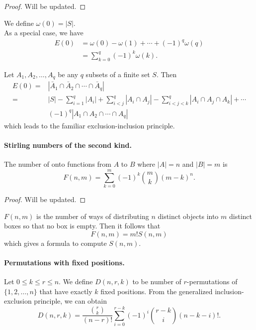 \documentclass[12pt,english,oneside]{scrbook}
\numberwithin{equation}{chapter}
\theoremstyle{definition}
\theoremstyle{plain}
\begin{document}
\begin{proof}
  Will be updated.
\end{proof}

We define $\omega(0) = |S|$. \\

As a special case, we have
\begin{align*}
  E(0) &= \omega(0) - \omega(1) + \cdots + (-1)^q \omega(q) \\
       &= \sum_{k=0}^q (-1)^k \omega(k).
\end{align*}

Let $A_1, A_2, \ldots, A_q$ be any $q$ subsets of a finite set $S$. Then
\begin{align*}
  E(0)=&|\bar A_1 \cap \bar A_2 \cap \cdots \cap \bar A_q | \\
  =&|S| - \sum_{i=1}^q |A_i| + \sum_{i<j}^q |A_i \cap A_j | - \sum_{i<j<k}^q |A_i \cap A_j \cap A_k | + \cdots \\
  &(-1)^q |A_1 \cap A_2 \cap \cdots \cap A_q |
\end{align*}
which leads to the familiar exclusion-inclusion principle.

\paragraph{Stirling numbers of the second kind.}

The number of onto functions from $A$ to $B$ where $|A|=n$ and $|B|=m$ is
\begin{equation}
  F(n,m) = \sum_{k=0}^m (-1)^k \binom{m}{k} (m-k)^n.
\end{equation}

\begin{proof}
  Will be updated.
\end{proof}

$F(n,m)$ is the number of ways of distributing $n$ distinct objects into $m$ distinct boxes so that no box is empty. Then it follows that
\begin{equation}
  F(n,m) = m! S(n,m)
\end{equation}
which gives a formula to compute $S(n,m)$.

\paragraph{Permutations with fixed positions.}

Let $0\leq k \leq r \leq n$. We define $D(n,r,k)$ to be number of $r$-permutations of $\{1,2,\ldots,n\}$ that have exactly $k$ fixed positions. From the generalized inclusion-exclusion principle, we can obtain
\begin{equation}
  D(n,r,k) = \frac{\binom{r}{k}}{(n-r)!} \sum_{i=0}^{r-k} (-1)^i \binom{r-k}{i}(n-k-i)!.
\end{equation}
\end{document}
